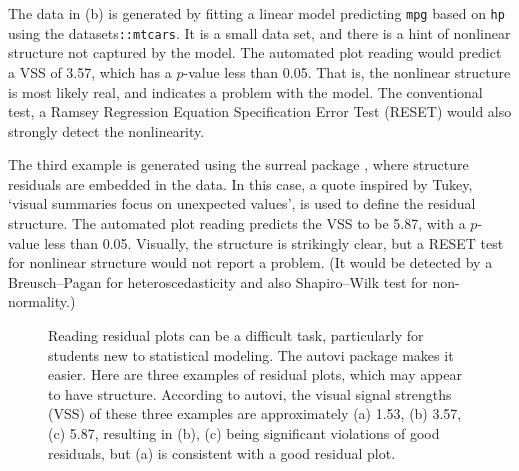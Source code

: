 \documentclass[
doublespace,
  times]{anzsauth}
\begin{document}
The data in (b) is generated by fitting a linear model predicting
\texttt{mpg} based on \texttt{hp} using the
\textsf{datasets}\texttt{::mtcars}. It is a small data set, and there is
a hint of nonlinear structure not captured by the model. The automated
plot reading would predict a VSS of 3.57, which has a \(p\)-value less
than 0.05. That is, the nonlinear structure is most likely real, and
indicates a problem with the model. The conventional test, a Ramsey
Regression Equation Specification Error Test (RESET)
\citep{ramsey1969tests} would also strongly detect the nonlinearity.

The third example is generated using the \textsf{surreal} package
\citep{surreal}, where structure residuals are embedded in the data. In
this case, a quote inspired by Tukey, `visual summaries focus on
unexpected values', is used to define the residual structure. The
automated plot reading predicts the VSS to be 5.87, with a \(p\)-value
less than 0.05. Visually, the structure is strikingly clear, but a RESET
test for nonlinear structure would not report a problem. (It would be
detected by a Breusch--Pagan for heteroscedasticity and also
Shapiro--Wilk test \citep{shapiro1965analysis} for non-normality.)

\begin{figure}


\caption{\label{fig-three-examples}Reading residual plots can be a
difficult task, particularly for students new to statistical modeling.
The \textsf{autovi} package makes it easier. Here are three examples of
residual plots, which may appear to have structure. According to autovi,
the visual signal strengths (VSS) of these three examples are
approximately (a) 1.53, (b) 3.57, (c) 5.87, resulting in (b), (c) being
significant violations of good residuals, but (a) is consistent with a
good residual plot.}

\end{figure}%
\end{document}
